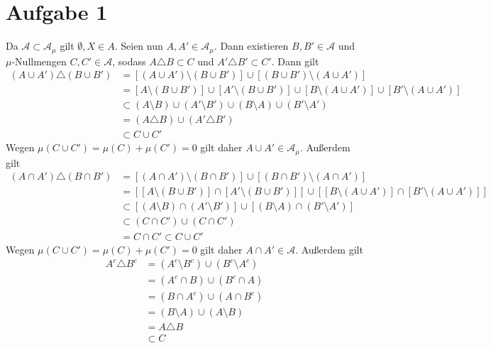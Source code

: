 \documentclass{article}
\begin{document}
\def\headheight{25pt}
    \section*{Aufgabe 1}    
    Da $\mathcal{A} \subset \mathcal{A}_\mu$ gilt $\emptyset, X \in A$.
    Seien nun $A, A' \in \mathcal{A}_\mu$. 
    Dann existieren $B, B'\in \mathcal{A}$ und $\mu$-Nullmengen $C, C'\in \mathcal{A}$, sodass $A\triangle B \subset C$ und $A'\triangle B' \subset C'$.
    Dann gilt
    \begin{align*}
        (A\cup A')\triangle (B\cup B') &= [(A\cup A')\setminus (B \cup B')] \cup [(B\cup B')\setminus (A\cup A')]\\
        &= [A\setminus(B \cup B')] \cup [A'\setminus(B \cup B')] \cup [B\setminus (A\cup A')] \cup [B'\setminus (A\cup A')]\\
        &\subset (A\setminus B) \cup (A'\setminus B') \cup (B\setminus A) \cup (B'\setminus A')\\
        &= (A \triangle B) \cup (A'\triangle B')\\
        &\subset C\cup C'
    \end{align*}
    Wegen $\mu(C \cup C') = \mu(C) + \mu(C') = 0$ gilt daher $A\cup A' \in \mathcal{A}_\mu$.
    Außerdem gilt
    \begin{align*}
        (A\cap A')\triangle (B\cap B') &= [(A\cap A')\setminus (B \cap B')] \cup [(B\cap B')\setminus (A\cap A')]\\
        &= [[A\setminus(B \cup B')] \cap [A'\setminus(B \cup B')]] \cup [[B\setminus (A\cup A')] \cap [B'\setminus (A\cup A')]]\\
        &\subset [(A\setminus B) \cap (A'\setminus B')] \cup [(B\setminus A) \cap (B'\setminus A')]\\
        &\subset (C \cap C') \cup (C \cap C')\\
        &= C\cap C'\subset C\cup C'
    \end{align*} 
    Wegen $\mu(C \cup C') = \mu(C) + \mu(C') = 0$ gilt daher $A\cap A' \in \mathcal{A}$.
    Außerdem gilt
    \begin{align*}
        A^c \triangle B^c &= (A^c \setminus B^c) \cup (B^c \setminus A^c)\\
        &= (A^c \cap B) \cup (B^c \cap A)\\
        &= (B \cap A^c) \cup (A \cap B^c)\\
        &= (B\setminus A) \cup (A \setminus B)\\
        &= A \triangle B\\  
        &\subset C
    \end{align*} 
\end{document}
